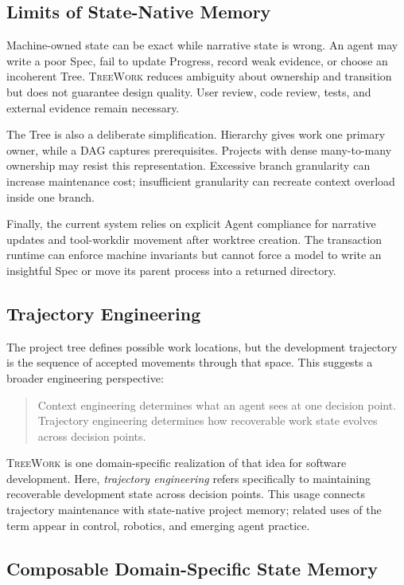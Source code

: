 \documentclass[11pt]{article}
\newcommand{\system}{\textsc{TreeWork}\xspace}
\theoremstyle{definition}
\begin{document}
\subsection{Limits of State-Native Memory}

Machine-owned state can be exact while narrative state is wrong.  An agent may
write a poor Spec, fail to update Progress, record weak evidence, or choose an
incoherent Tree.  \system reduces ambiguity about ownership and transition but
does not guarantee design quality.  User review, code review, tests, and
external evidence remain necessary.

The Tree is also a deliberate simplification.  Hierarchy gives work one primary
owner, while a DAG captures prerequisites.  Projects with dense many-to-many
ownership may resist this representation.  Excessive branch granularity can
increase maintenance cost; insufficient granularity can recreate context
overload inside one branch.

Finally, the current system relies on explicit Agent compliance for narrative
updates and tool-workdir movement after worktree creation.  The transaction
runtime can enforce machine invariants but cannot force a model to write an
insightful Spec or move its parent process into a returned directory.

\subsection{Trajectory Engineering}

The project tree defines possible work locations, but the development
trajectory is the sequence of accepted movements through that space.  This
suggests a broader engineering perspective:

\begin{quote}
Context engineering determines what an agent sees at one decision point.
Trajectory engineering determines how recoverable work state evolves across
decision points.
\end{quote}

\system is one domain-specific realization of that idea for software
development.  Here, \emph{trajectory engineering} refers specifically to
maintaining recoverable development state across decision points.  This usage
connects trajectory maintenance with state-native project memory; related uses
of the term appear in control, robotics, and emerging agent practice.

\subsection{Composable Domain-Specific State Memory}
\end{document}
